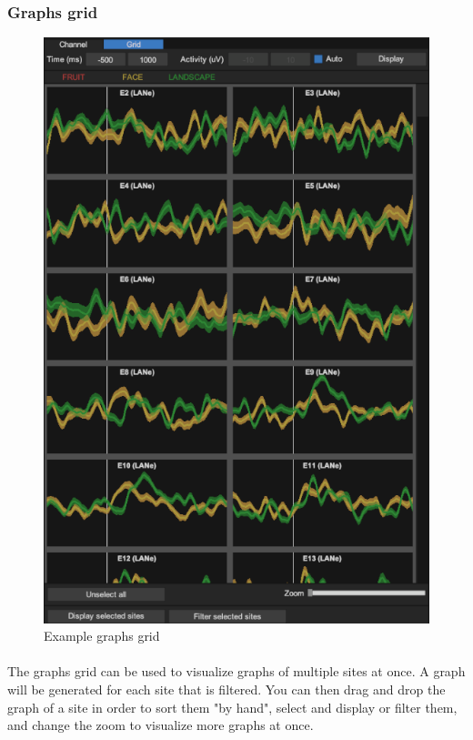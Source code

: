 \documentclass[a4paper]{article}
\begin{document}
\subsubsection{Graphs grid}
\begin{figure}[H]
\begin{center}
\includegraphics[scale=0.45]{Grid.png}
\end{center}
\caption{\label{graphsGrid}Example graphs grid}
\end{figure}
\paragraph{} The graphs grid can be used to visualize graphs of multiple sites at once. A graph will be generated for each site that is filtered. You can then drag and drop the graph of a site in order to sort them "by hand", select and display or filter them, and change the zoom to visualize more graphs at once.
\appendix
\end{document}
